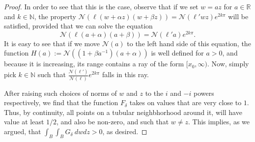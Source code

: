 \documentclass[11pt]{amsart}
\theoremstyle{definition}
\newcommand{\N}{{\mathbb N}}
\newcommand{\NN}{{\mathcal N}}
\newcommand{\R}{{\mathbb R}}
\begin{document}
\begin{proof}
In order to see that this is the case, observe that if we set $w=az$ for $a \in \R$ and $k \in \N$, the property $\NN(\ell(w+\alpha z)(w+\beta z))=\NN(\ell'wz)e^{2k\pi}$ will be satisfied, provided that we can solve the equation 
\[
\NN(\ell(a+\alpha)(a+\beta))=\NN(\ell'a)e^{2k\pi}.
\]
It is easy to see that if we move $\NN(a)$ to the left hand side of this equation, the function $H(a):=\NN((1+\beta a^{-1})(a+\alpha))$ is well defined for $a>0$, and because it is increasing, its range contains a ray of the form $[x_0,\infty)$. Now, simply pick $k \in \N$ such that $\frac{\NN(\ell')}{\NN(\ell)}e^{2k\pi}$ falls in this ray.

After raising such choices of norms of $w$ and $z$ to the $i$ and $-i$ powers respectively, we find that the function $F_{\delta}$ takes on values that are very close to $1$. Thus, by continuity, all points on a tubular neighbhorhood around it, will have value at least $1/2$, and also be non-zero, and such that $w \neq z$. This implies, as we argued, that $\int_B\int_B G_{\delta} \ dwdz>0$, as desired. 




\end{proof}
\end{document}

